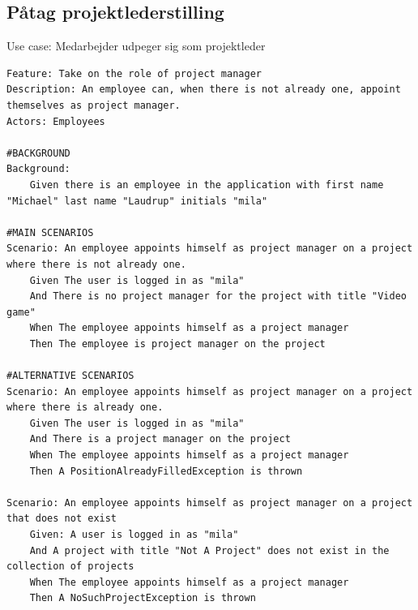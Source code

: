 \subsection{Påtag projektlederstilling} 
\begin{listing}[H]
    \centering
    \caption{Use case: Medarbejder udpeger sig som projektleder} \label{lst:usecase_bliv_projektleder}
    \begin{verbatim}  
Feature: Take on the role of project manager
Description: An employee can, when there is not already one, appoint themselves as project manager.
Actors: Employees

#BACKGROUND
Background:
    Given there is an employee in the application with first name "Michael" last name "Laudrup" initials "mila"

#MAIN SCENARIOS
Scenario: An employee appoints himself as project manager on a project where there is not already one.
    Given The user is logged in as "mila"
    And There is no project manager for the project with title "Video game"
    When The employee appoints himself as a project manager
    Then The employee is project manager on the project

#ALTERNATIVE SCENARIOS
Scenario: An employee appoints himself as project manager on a project where there is already one.
    Given The user is logged in as "mila"
    And There is a project manager on the project
    When The employee appoints himself as a project manager
    Then A PositionAlreadyFilledException is thrown

Scenario: An employee appoints himself as project manager on a project that does not exist
    Given: A user is logged in as "mila"
    And A project with title "Not A Project" does not exist in the collection of projects
    When The employee appoints himself as a project manager
    Then A NoSuchProjectException is thrown
    \end{verbatim}
\end{listing}



